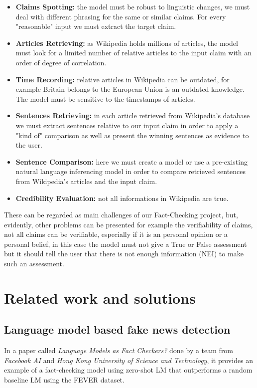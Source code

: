 \documentclass[10pt, english]{report}
\begin{document}
\begin{itemize}
	\item \textbf{Claims Spotting:} the model must be robust to linguistic changes, we must deal with different phrasing for the same or similar claims. For every "reasonable" input we must extract the target claim.
	\item \textbf{Articles Retrieving:} as Wikipedia holds millions of articles, the model must look for a limited number of relative articles to the input claim with an order of degree of correlation.
	\item \textbf{Time Recording:} relative articles in Wikipedia can be outdated, for example Britain belongs to the European Union is an outdated knowledge. The model must be sensitive to the timestamps of articles.
	\item \textbf{Sentences Retrieving:}  in each article retrieved from Wikipedia's database we must extract sentences relative to our input claim in order to apply a "kind of" comparison as well as present the winning sentences as evidence to the user.
	\item \textbf{Sentence Comparison:} here we must create a model or use a pre-existing natural language inferencing model in order to compare retrieved sentences from Wikipedia's articles and the input claim. 
	\item \textbf{Credibility Evaluation:} not all informations in Wikipedia are true.
\end{itemize}

These can be regarded as main challenges of our Fact-Checking project, but, evidently, other problems can be presented for example the verifiability of claims, not all claims can be verifiable, especially if it is an personal opinion or a personal belief, in this case the model must not give a True or False assessment but it should tell the user that there is not enough information (NEI) to make such an assessment.


\section{Related work and solutions}
\subsection{Language model based fake news detection \cite{lee2020language}}
In a paper called \textit{Language Models as Fact Checkers?} done by a team from \textit{Facebook AI} and \textit{Hong Kong University of Science and Technology}, it provides an example of a fact-checking model using zero-shot LM that outperforms a random baseline LM using the FEVER dataset.\\
\end{document}

